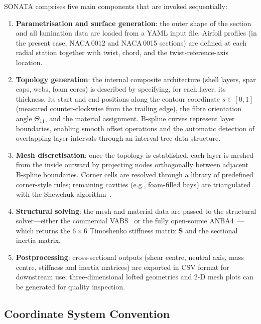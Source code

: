 SONATA comprises five main components that are invoked sequentially:
\begin{enumerate}
    \item \textbf{Parametrisation and surface generation}: the outer shape of the section and all
          lamination data are loaded from a YAML input file.
          Airfoil profiles (in the present case, NACA\,0012 and NACA\,0015 sections) are defined
          at each radial station together with twist, chord, and the twist-reference-axis location.
    \item \textbf{Topology generation}: the internal composite architecture (shell layers, spar
          caps, webs, foam cores) is described by specifying, for each layer, its thickness, its
          start and end positions along the contour coordinate $s\in[0,1]$ (measured
          counter-clockwise from the trailing edge), the fibre orientation angle $\Theta_{11}$,
          and the material assignment.
          B-spline curves represent layer boundaries, enabling smooth offset operations and the
          automatic detection of overlapping layer intervals through an interval-tree data structure.
    \item \textbf{Mesh discretisation}: once the topology is established, each layer is meshed
          from the inside outward by projecting nodes orthogonally between adjacent B-spline
          boundaries.
          Corner cells are resolved through a library of predefined corner-style rules;
          remaining cavities (e.g., foam-filled bays) are triangulated with the Shewchuk
          algorithm~\cite{shewchuk1996triangle}.
    \item \textbf{Structural solving}: the mesh and material data are passed to the structural
          solver---either the commercial VABS~\cite{cesnik1995vabs} or the fully open-source
          ANBA4~\cite{morandini2010anba4}---which returns the $6\times6$ Timoshenko stiffness
          matrix $\mathbf{S}$ and the sectional inertia matrix.
    \item \textbf{Postprocessing}: cross-sectional outputs (shear centre, neutral axis, mass
          centre, stiffness and inertia matrices) are exported in CSV format for downstream use;
          three-dimensional lofted geometries and 2-D mesh plots can be generated for quality
          inspection.
\end{enumerate}

\subsection{Coordinate System Convention}


